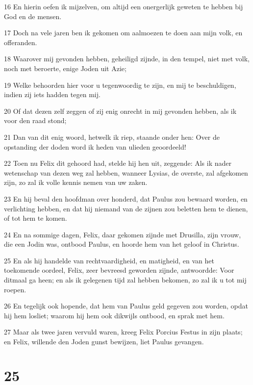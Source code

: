 \par 16 En hierin oefen ik mijzelven, om altijd een onergerlijk geweten te hebben bij God en de mensen.
\par 17 Doch na vele jaren ben ik gekomen om aalmoezen te doen aan mijn volk, en offeranden.
\par 18 Waarover mij gevonden hebben, geheiligd zijnde, in den tempel, niet met volk, noch met beroerte, enige Joden uit Azie;
\par 19 Welke behoorden hier voor u tegenwoordig te zijn, en mij te beschuldigen, indien zij iets hadden tegen mij.
\par 20 Of dat dezen zelf zeggen of zij enig onrecht in mij gevonden hebben, als ik voor den raad stond;
\par 21 Dan van dit enig woord, hetwelk ik riep, staande onder hen: Over de opstanding der doden word ik heden van ulieden geoordeeld!
\par 22 Toen nu Felix dit gehoord had, stelde hij hen uit, zeggende: Als ik nader wetenschap van dezen weg zal hebben, wanneer Lysias, de overste, zal afgekomen zijn, zo zal ik volle kennis nemen van uw zaken.
\par 23 En hij beval den hoofdman over honderd, dat Paulus zou bewaard worden, en verlichting hebben, en dat hij niemand van de zijnen zou beletten hem te dienen, of tot hem te komen.
\par 24 En na sommige dagen, Felix, daar gekomen zijnde met Drusilla, zijn vrouw, die een Jodin was, ontbood Paulus, en hoorde hem van het geloof in Christus.
\par 25 En als hij handelde van rechtvaardigheid, en matigheid, en van het toekomende oordeel, Felix, zeer bevreesd geworden zijnde, antwoordde: Voor ditmaal ga heen; en als ik gelegenen tijd zal hebben bekomen, zo zal ik u tot mij roepen.
\par 26 En tegelijk ook hopende, dat hem van Paulus geld gegeven zou worden, opdat hij hem losliet; waarom hij hem ook dikwijls ontbood, en sprak met hem.
\par 27 Maar als twee jaren vervuld waren, kreeg Felix Porcius Festus in zijn plaats; en Felix, willende den Joden gunst bewijzen, liet Paulus gevangen.

\chapter{25}

